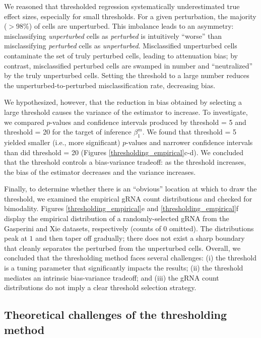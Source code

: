 \documentclass[12pt]{article}
\begin{document}
We reasoned that thresholded regression systematically underestimated true effect sizes, especially for small thresholds. For a given perturbation, the majority ($>98\%$) of cells are unperturbed. This imbalance leads to an asymmetry: misclassifying \textit{unperturbed} cells as \textit{perturbed} is intuitively ``worse'' than misclassifying \textit{perturbed} cells as \textit{unperturbed}. Misclassified unperturbed cells contaminate the set of truly perturbed cells, leading to attenuation bias; by contrast, misclassified perturbed cells are swamped in number and ``neutralized'' by the truly unperturbed cells. Setting the threshold to a large number reduces the unperturbed-to-perturbed misclassification rate, decreasing bias.

We hypothesized, however, that the reduction in bias obtained by selecting a large threshold causes the variance of the estimator to increase. To investigate, we compared $p$-values and confidence intervals produced by threshold = 5 and threshold = 20 for the target of inference $\beta^m_1$. We found that threshold = 5 yielded smaller (i.e., more significant) $p$-values and narrower confidence intervals than did threshold = 20 (Figures \ref{thresholding_empirical}c-d). We concluded that the threshold controls a bias-variance tradeoff: as the threshold increases, the bias of the estimator decreases and the variance increases.

Finally, to determine whether there is an ``obvious'' location at which to draw the threshold, we examined the empirical gRNA count distributions and checked for bimodality. Figures \ref{thresholding_empirical}e and \ref{thresholding_empirical}f display the empirical distribution of a randomly-selected gRNA from the Gasperini and Xie datasets, respectively (counts of $0$ omitted). The distributions peak at $1$ and then taper off gradually; there does not exist a sharp boundary that cleanly separates the perturbed from the unperturbed cells. Overall, we concluded that the thresholding method faces several challenges: (i) the threshold is a tuning parameter that significantly impacts the results; (ii) the threshold mediates an intrinsic bias-variance tradeoff; and (iii) the gRNA count distributions do not imply a clear threshold selection strategy.

\subsection{Theoretical challenges of the thresholding method}\label{sec:thresholding_theory}
\end{document}
